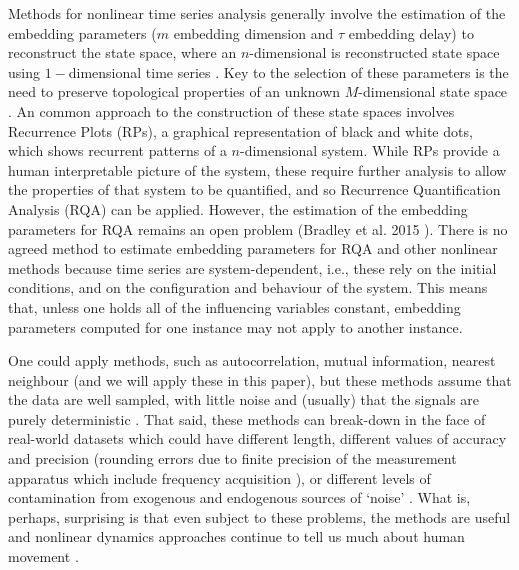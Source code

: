 \documentclass[fleqn,10pt]{wlscirep}
\begin{document}
Methods for nonlinear time series analysis generally involve the estimation of the embedding parameters ($m$ embedding dimension and $\tau$ embedding delay) to reconstruct the state space, where an $n$-dimensional is reconstructed state space using $1-$dimensional time series \cite{Quintana-Duque2012, Quintana-Duque2016, sama2013, frank2010, gomezgarcia2014, marwan2011, stergiou2011}.
Key to the selection of these parameters is the need to preserve topological properties of an unknown $M$-dimensional state space \cite{takens1981}.
An common approach to the construction of these state spaces involves Recurrence Plots (RPs), a graphical representation of black and white dots, which shows recurrent patterns of a $n$-dimensional system.
While RPs provide a human interpretable picture of the system, these require further analysis to allow the properties of that system to be quantified, and so Recurrence Quantification Analysis (RQA) can be applied.
However, the estimation of the embedding parameters for RQA remains an open problem (Bradley et al. 2015 \cite{bradley2015}).
There is no agreed method to estimate embedding parameters for RQA and other nonlinear methods \cite{bradley2015} because time series are system-dependent, i.e., these rely on the initial conditions, and on the configuration and behaviour of the system.
This means that, unless one holds all of the influencing variables constant, embedding parameters computed for one instance may not apply to another instance.

One could apply methods, such as autocorrelation, mutual information, nearest neighbour (and we will apply these in this paper), but these methods assume that the data are well sampled, with little noise and (usually) that the signals are purely deterministic \cite{garland2016, kantz2003}.
That said, these methods can break-down in the face of real-world datasets which could have different length, different values of accuracy and precision (rounding errors due to finite precision of the measurement apparatus which include frequency acquisition \cite{frank2010}), or different levels of contamination from exogenous and endogenous sources of ‘noise’ \cite{garland2016}.
What is, perhaps, surprising is that even subject to these problems, the methods are useful and nonlinear dynamics approaches continue to tell us much about human movement \cite{Quintana-Duque2012, Quintana-Duque2016, sama2013, frank2010, gomezgarcia2014, marwan2011, stergiou2011, bradley2015}.
\end{document}
